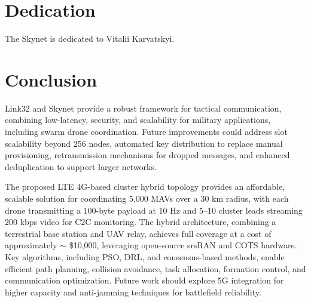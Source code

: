 \documentclass{article}
\begin{document}
\section{Dedication}
The Skynet is dedicated to Vitalii Karvatskyi.

\section{Conclusion}
Link32 and Skynet provide a robust framework for tactical communication, combining low-latency,
security, and scalability for military applications, including swarm drone coordination. Future
improvements could address slot scalability beyond 256 nodes, automated key distribution to replace
manual provisioning, retransmission mechanisms for dropped messages, and enhanced deduplication to
support larger networks.

The proposed LTE 4G-based cluster hybrid topology provides an affordable,
scalable solution for coordinating 5,000 MAVs over a 30 km radius,
with each drone transmitting a 100-byte payload at 10 Hz and 5--10 cluster
leads streaming 200 kbps video for C2C monitoring. The hybrid architecture,
combining a terrestrial base station and UAV relay, achieves full coverage
at a cost of approximately $\sim$ \$10,000, leveraging open-source srsRAN and COTS
hardware. Key algorithms, including PSO, DRL, and consensus-based methods,
enable efficient path planning, collision avoidance, task allocation,
formation control, and communication optimization. Future work should
explore 5G integration for higher capacity and anti-jamming techniques
for battlefield reliability.
\end{document}
